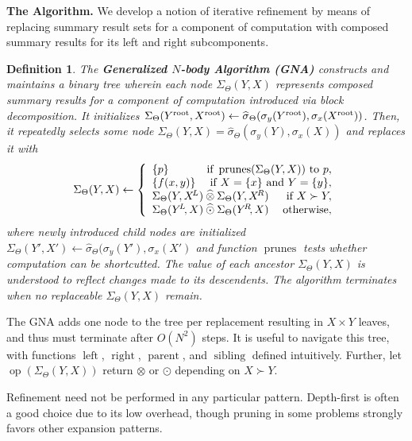 \documentclass{article}
\newtheorem{definition} {Definition}
\newcommand{\killspace}{\vspace{-0.08in}}
\newcommand{\GNP}[1][\psi]{{#1}_{\Theta}}
\newcommand{\sigmahat}{\mathbin{\widehat{\sigma}}}
\newcommand{\otimeshat}{\mathbin{\widehat{\otimes}}}
\newcommand{\odothat}{\mathbin{\widehat{\odot}}}
\DeclareMathOperator{\prunes}{prunes}
\DeclareMathOperator{\leftchild}{left}
\DeclareMathOperator{\rightchild}{right}
\DeclareMathOperator{\parent}{parent}
\DeclareMathOperator{\sibling}{sibling}
\DeclareMathOperator{\op}{op}
\newcommand{\kdroot}[1]{#1^{\text{\rm root}}}
\newcommand{\kdleft}[1]{#1^{\!L}}
\newcommand{\kdright}[1]{#1^{\!R}}
\begin{document}
{\bf The Algorithm.}  We develop a notion of iterative refinement by
means of replacing summary result sets for a component of computation
with composed summary results for its left and right subcomponents.
\begin{definition}
  The {\bf Generalized $N$-body Algorithm (GNA)} constructs and maintains a
  binary tree wherein each node $\GNP[\Sigma](Y,X)$ represents
  composed summary results for a component of computation introduced
  via block decomposition.  It initializes
  $\GNP[\Sigma](\kdroot{Y},\kdroot{X}) \gets
  \GNP[\sigmahat](\sigma_y(\kdroot{Y}),\sigma_x(\kdroot{X}))$.  Then,
  it repeatedly selects some node $\GNP[\Sigma](Y,X) =
  \GNP[\sigmahat](\sigma_y(Y),\sigma_x(X))$ and replaces it with
  \[
  \GNP[\Sigma](Y,X) \gets \left\{ \begin{array}{lrr}
    \{p\} & \multicolumn{2}{r}{\mbox{\rm if } \prunes(\GNP[\Sigma](Y,X)) \mbox{ \rm to } p,} \\
    \{f(x,y)\} & \multicolumn{2}{r}{\mbox{\rm if } X = \{x\} \mbox{ \rm and } Y = \{y\},} \\
    \multicolumn{2}{l}{\GNP[\Sigma](Y,\kdleft{X}) \otimeshat \GNP[\Sigma](Y,\kdright{X})} & \mbox{\rm if } X \succ Y, \\
    \multicolumn{2}{l}{\GNP[\Sigma](\kdleft{Y}\!,X) \odothat \GNP[\Sigma](\kdright{Y}\!,X)} & \mbox{\rm otherwise},
  \end{array} \right.
  \]
  where newly introduced child nodes are initialized
  $\GNP[\Sigma](Y',X') \gets
  \GNP[\sigmahat](\sigma_y(Y'),\sigma_x(X')$ and function $\prunes$
  tests whether computation can be shortcutted.  The value of each
  ancestor $\GNP[\Sigma](Y,X)$ is understood to reflect changes made
  to its descendents.  The algorithm terminates when no replaceable
  $\GNP[\Sigma](Y,X)$ remain.
\end{definition}
\killspace
\noindent The GNA adds one node to the tree per replacement resulting in $X \times Y$ leaves, and thus must terminate after $O(N^2)$ steps.
It is useful to navigate this tree, with functions $\leftchild$, $\rightchild$, $\parent$, and $\sibling$ defined intuitively.
Further, let $\op(\GNP[\Sigma](Y,X))$ return $\otimes$ or $\odot$ depending on $X \succ Y$.

Refinement need not be performed in any particular pattern.
Depth-first is often a good choice due to its low overhead, though
pruning in some problems strongly favors other expansion patterns.
\end{document}
